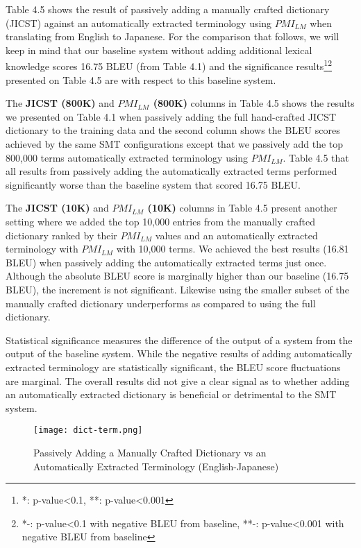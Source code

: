 Table 4.5 shows the result of passively adding a manually crafted dictionary (JICST) against an automatically extracted terminology using $PMI_{LM}$ when translating from English to Japanese. For the comparison that follows, we will keep in mind that our baseline system without adding additional lexical knowledge scores 16.75 BLEU (from Table 4.1) and the significance results\footnote{*: p-value<0.1, **: p-value<0.001}\footnote{*-: p-value<0.1 with negative BLEU from baseline, **-: p-value<0.001 with negative BLEU from baseline} presented on Table 4.5 are with respect to this baseline system.

The \textbf{JICST (800K)} and \textbf{$PMI_{LM}$ (800K)} columns in Table 4.5 shows the results we presented on Table 4.1 when passively adding the full hand-crafted JICST dictionary to the training data and the second column shows the BLEU scores achieved by the same SMT configurations except that we passively add the top 800,000 terms automatically extracted terminology using $PMI_{LM}$. Table 4.5 that all results from passively adding the automatically extracted terms performed significantly worse than the baseline system that scored 16.75 BLEU.

The \textbf{JICST (10K)} and \textbf{$PMI_{LM}$ (10K)}  columns in Table 4.5 present another setting where we added the top 10,000 entries from the manually crafted dictionary ranked by their $PMI_{LM}$ values and an automatically extracted terminology with $PMI_{LM}$ with 10,000 terms. We achieved the best results (16.81 BLEU) when passively adding the automatically extracted terms just once. Although the absolute BLEU score is marginally higher than our baseline (16.75 BLEU), the increment is not significant. Likewise using the smaller subset of the manually crafted dictionary underperforms as compared to using the full dictionary. 

Statistical significance measures the difference of the output of a system from the output of the baseline system. While the negative results of adding automatically extracted terminology are statistically significant, the BLEU score fluctuations are marginal. The overall results did not give a clear signal as to whether adding an automatically extracted dictionary is beneficial or detrimental to the SMT system. 

\begin{figure}[!htb]
\centering
	\hspace{-2em}%
	\texttt{[image: dict-term.png]} \\[-1em]
	\caption{Passively Adding a Manually Crafted Dictionary vs an Automatically Extracted Terminology (English-Japanese)}
	\label{fig-manvauto}
\end{figure}


